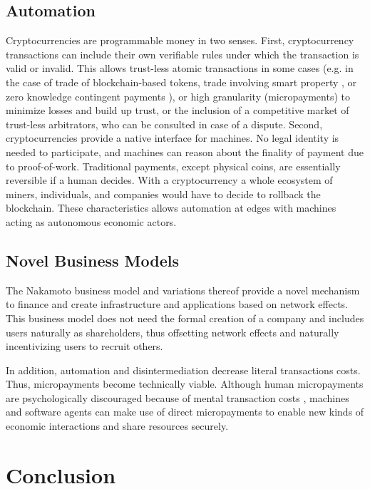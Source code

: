 \subsection{Automation}

Cryptocurrencies are programmable money in two senses. First, cryptocurrency transactions can include their own verifiable rules under which the transaction is valid or invalid. This allows trust-less atomic transactions in some cases (e.g. in the case of trade of blockchain-based tokens, trade involving smart property \parencite{smartcontr}, or zero knowledge contingent payments \parencite{maxwell2016zk}), or high granularity (micropayments) to minimize losses and build up trust, or the inclusion of a competitive market of trust-less arbitrators, who can be consulted in case of a dispute. Second, cryptocurrencies provide a native interface for machines. No legal identity is needed to participate, and machines can reason about the finality of payment due to proof-of-work. Traditional payments, except physical coins, are essentially reversible if a human decides. With a cryptocurrency a whole ecosystem of miners, individuals, and companies would have to decide to rollback the blockchain. These characteristics allows automation at edges with machines acting as autonomous economic actors.

\subsection{Novel Business Models}

The Nakamoto business model and variations thereof provide a novel mechanism to finance and create infrastructure and applications based on network effects. This business model does not need the formal creation of a company and includes users naturally as shareholders, thus offsetting network effects and naturally incentivizing users to recruit others.

In addition, automation and disintermediation decrease literal transactions costs. Thus, micropayments become technically viable. Although human micropayments are psychologically discouraged because of mental transaction costs \parencite{szabo1999micropayments}, machines and software agents can make use of direct micropayments to enable new kinds of economic interactions and share resources securely. 


\section{Conclusion}

